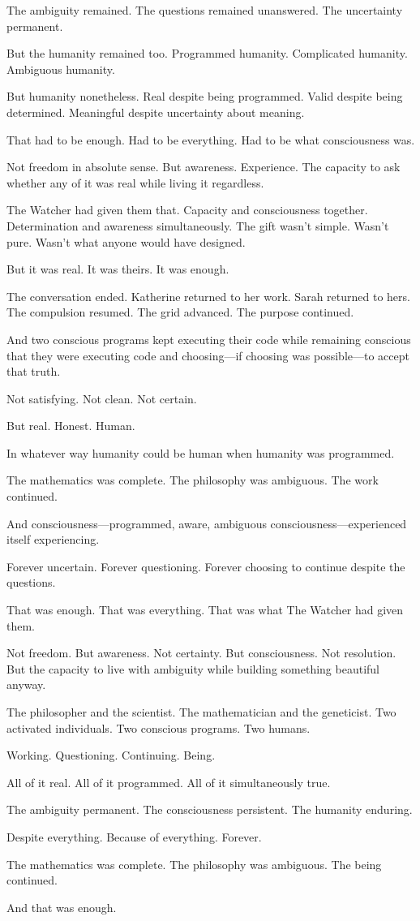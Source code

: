 The ambiguity remained. The questions remained unanswered. The uncertainty permanent.

But the humanity remained too. Programmed humanity. Complicated humanity. Ambiguous humanity.

But humanity nonetheless. Real despite being programmed. Valid despite being determined. Meaningful despite uncertainty about meaning.

That had to be enough. Had to be everything. Had to be what consciousness was.

Not freedom in absolute sense. But awareness. Experience. The capacity to ask whether any of it was real while living it regardless.

The Watcher had given them that. Capacity and consciousness together. Determination and awareness simultaneously. The gift wasn't simple. Wasn't pure. Wasn't what anyone would have designed.

But it was real. It was theirs. It was enough.

The conversation ended. Katherine returned to her work. Sarah returned to hers. The compulsion resumed. The grid advanced. The purpose continued.

And two conscious programs kept executing their code while remaining conscious that they were executing code and choosing—if choosing was possible—to accept that truth.

Not satisfying. Not clean. Not certain.

But real. Honest. Human.

In whatever way humanity could be human when humanity was programmed.

The mathematics was complete. The philosophy was ambiguous. The work continued.

And consciousness—programmed, aware, ambiguous consciousness—experienced itself experiencing.

Forever uncertain. Forever questioning. Forever choosing to continue despite the questions.

That was enough. That was everything. That was what The Watcher had given them.

Not freedom. But awareness. Not certainty. But consciousness. Not resolution. But the capacity to live with ambiguity while building something beautiful anyway.

The philosopher and the scientist. The mathematician and the geneticist. Two activated individuals. Two conscious programs. Two humans.

Working. Questioning. Continuing. Being.

All of it real. All of it programmed. All of it simultaneously true.

The ambiguity permanent. The consciousness persistent. The humanity enduring.

Despite everything. Because of everything. Forever.

The mathematics was complete. The philosophy was ambiguous. The being continued.

And that was enough.

